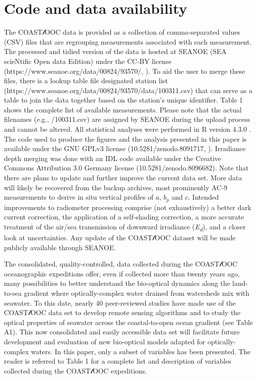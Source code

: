 \documentclass[essd, manuscript]{copernicus}
\begin{document}
\section{Code and data availability}

The COAST$\mathscr{l}$OOC data is provided as a collection of comma-separated values (CSV) files that are regrouping measurements associated with each measurement. The processed and tidied version of the data is hosted at SEANOE (SEA scieNtific Open data Edition) under the CC-BY license (https://www.seanoe.org/data/00824/93570/, \citealt{massicotte2023}). To aid the user to merge these files, there is a lookup table file designated station list (https://www.seanoe.org/data/00824/93570/data/100311.csv) that can serve as a table to join the data together based on the station’s unique identifier. Table 1 shows the complete list of available measurements. Please note that the actual filenames (e.g., /100311.csv) are assigned by SEANOE during the upload process and cannot be altered.   All statistical analyses were performed in R version 4.3.0 \citep{RCoreTeam2022}. The code used to produce the figures and the analysis presented in this paper is available under the GNU GPLv3 license (10.5281/zenodo.8091717, \citealt{massicotte2023}). Irradiance depth merging was done with an IDL code available under the Creative Commons Attribution 3.0 Germany license (10.5281/zenodo.8096682). Note that there are plans to update and further improve the current data set. More data will likely be recovered from the backup archives, most prominently AC-9 measurements to derive in situ vertical profiles of $a$, $b_p$ and $c$. Intended improvements to radiometer processing comprise (not exhaustively) a better dark current correction, the application of a self-shading correction, a more accurate treatment of the air/sea transmission of downward irradiance (\textit{E\textsubscript{d}}), and a closer look at uncertainties. Any update of the COAST$\mathscr{l}$OOC dataset will be made publicly available through SEANOE.

\conclusions  %

The consolidated, quality-controlled, data collected during the COAST$\mathscr{l}$OOC oceanographic expeditions offer, even if collected more than twenty years ago, many possibilities to better understand the bio-optical dynamics along the land-to-sea gradient where optically-complex water drained from watersheds mix with seawater. To this date, nearly 40 peer-reviewed studies have made use of the COAST$\mathscr{l}$OOC data set to develop remote sensing algorithms and to study the optical properties of seawater across the coastal-to-open ocean gradient (see Table A1). This now consolidated and easily accessible data set will facilitate future development and evaluation of new bio-optical models adapted for optically-complex waters. In this paper, only a subset of variables has been presented. The reader is referred to Table 1 for a complete list and description of variables collected during the COAST$\mathscr{l}$OOC expeditions.
\end{document}

